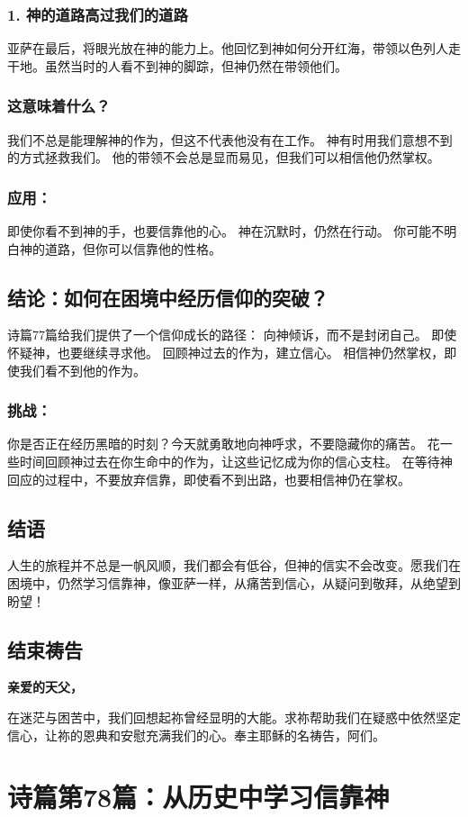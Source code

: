 \documentclass[a4paper, 12pt]{article}
\begin{document}
\subsubsection*{1. 神的道路高过我们的道路}
亚萨在最后，将眼光放在神的能力上。他回忆到神如何分开红海，带领以色列人走干地。虽然当时的人看不到神的脚踪，但神仍然在带领他们。
\subsubsection*{这意味着什么？}
我们不总是能理解神的作为，但这不代表他没有在工作。
神有时用我们意想不到的方式拯救我们。
他的带领不会总是显而易见，但我们可以相信他仍然掌权。
\subsubsection*{应用：}
即使你看不到神的手，也要信靠他的心。
神在沉默时，仍然在行动。
你可能不明白神的道路，但你可以信靠他的性格。
\subsection*{结论：如何在困境中经历信仰的突破？}
诗篇77篇给我们提供了一个信仰成长的路径：
向神倾诉，而不是封闭自己。
即使怀疑神，也要继续寻求他。
回顾神过去的作为，建立信心。
相信神仍然掌权，即使我们看不到他的作为。
\subsubsection*{挑战：}
你是否正在经历黑暗的时刻？今天就勇敢地向神呼求，不要隐藏你的痛苦。
花一些时间回顾神过去在你生命中的作为，让这些记忆成为你的信心支柱。
在等待神回应的过程中，不要放弃信靠，即使看不到出路，也要相信神仍在掌权。
\subsection*{结语}
人生的旅程并不总是一帆风顺，我们都会有低谷，但神的信实不会改变。愿我们在困境中，仍然学习信靠神，像亚萨一样，从痛苦到信心，从疑问到敬拜，从绝望到盼望！
\subsection*{结束祷告}
\textbf{亲爱的天父，}

在迷茫与困苦中，我们回想起祢曾经显明的大能。求祢帮助我们在疑惑中依然坚定信心，让祢的恩典和安慰充满我们的心。奉主耶稣的名祷告，阿们。
\newpage
\section{诗篇第78篇：从历史中学习信靠神}
\end{document}
